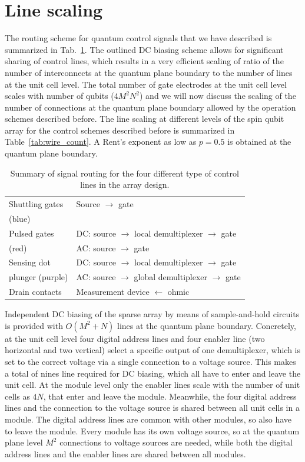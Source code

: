 \documentclass[aps,prl,reprint,superscriptaddress,floatfix]{revtex4-1}
\begin{document}
\section{Line scaling}
\label{sec:line_scaling}
The routing scheme for quantum control signals that we have described is summarized in Tab.~\ref{tab:routing}.
The outlined DC biasing scheme allows for significant sharing of control lines, which results in a very efficient scaling of ratio of the number of interconnects at the quantum plane boundary to the number of lines at the unit cell level.
The total number of gate electrodes at the unit cell level scales with number of qubits ($4M^2N^2$) and we will now discuss the scaling of the number of connections at the quantum plane boundary allowed by the operation schemes described before.
The line scaling at different levels of the spin qubit array for the control schemes described before is summarized in Table~\ref{tab:wire_count}.
A Rent’s exponent as low as $p=0.5$ is obtained at the quantum plane boundary.

\begin{table}[b]
    \centering
    \begin{tabular}{l|l}
        Shuttling gates & Source $\rightarrow$ gate  \\
        (blue) & \\
        \hline
        Pulsed gates & DC: source $\rightarrow$ local demultiplexer $\rightarrow$ gate \\
        (red) & AC: source $\rightarrow$ gate \\
        \hline
        Sensing dot & DC: source $\rightarrow$ local demultiplexer $\rightarrow$ gate \\
        plunger (purple) & AC: source $\rightarrow$ global demultiplexer $\rightarrow$ gate \\
        \hline
        Drain contacts & Measurement device $\leftarrow$ ohmic
    \end{tabular}
    \caption{Summary of signal routing for the four different type of control lines in the array design.}
    \label{tab:routing}
\end{table}

Independent DC biasing of the sparse array by means of sample-and-hold circuits is provided with $O(M^2+N)$ lines at the quantum plane boundary.
Concretely, at the unit cell level four digital address lines and four enabler line (two horizontal and two vertical) select a specific output of one demultiplexer, which is set to the correct voltage via a single connection to a voltage source.
This makes a total of nines line required for DC biasing, which all have to enter and leave the unit cell.
At the module level only the enabler lines scale with the number of unit cells as $4N$, that enter and leave the module.
Meanwhile, the four digital address lines and the connection to the voltage source is shared between all unit cells in a module. The digital address lines are common with other modules, so also have to leave the module.
Every module has its own voltage source, so at the quantum plane level $M^2$ connections to voltage sources are needed, while both the digital address lines and the enabler lines are shared between all modules.
\end{document}
